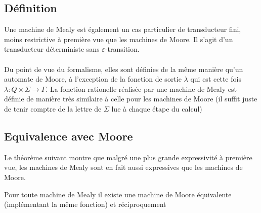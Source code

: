 \documentclass{scrartcl}
\begin{document}
\begin{flushleft}
\subsection{Définition}

Une machine de Mealy est également un cas particulier de transducteur fini, moins restrictive à première vue que les machines de Moore.
Il s'agit d'un transducteur déterministe sans $\varepsilon$-transition.
\\~\\
Du point de vue du formalisme, elles sont définies de la même manière qu'un automate de Moore, à l'exception de la fonction de sortie
$\lambda$ qui est cette fois $\lambda : Q \times \Sigma \rightarrow \Gamma$. La fonction rationelle réalisée par une machine de Mealy
est définie de manière très similaire à celle pour les machines de Moore (il suffit juste de tenir comptre de la lettre de $\Sigma$ lue à chaque
étape du calcul)

\subsection{Equivalence avec Moore}

Le théorème suivant montre que malgré une plus grande expressivité à première vue, les machines de Mealy sont en fait aussi expressives que les machines
de Moore.

\begin{theorem}
    Pour toute machine de Mealy il existe une machine de Moore équivalente (implémentant la même fonction) et réciproquement
\end{theorem}


\end{flushleft}
\end{document}
